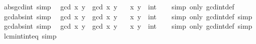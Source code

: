 \begin{isabellebody}
\ abs{\isacharunderscore}{\kern0pt}gcd{\isacharunderscore}{\kern0pt}int\ {\isacharbrackleft}{\kern0pt}simp{\isacharbrackright}{\kern0pt}{\isacharcolon}{\kern0pt}\isanewline
\ \ {\isachardoublequoteopen}{\isasymbar}gcd\ x\ y{\isasymbar}\ {\isacharequal}{\kern0pt}\ gcd\ x\ y{\isachardoublequoteclose}\isanewline
\ \ \ x\ y\ {\isacharcolon}{\kern0pt}{\isacharcolon}{\kern0pt}\ int\isanewline
%
\isadelimproof
\ \ %
\endisadelimproof
%
\isatagproof
{}\isamarkupfalse%
\ {\isacharparenleft}{\kern0pt}simp\ only{\isacharcolon}{\kern0pt}\ gcd{\isacharunderscore}{\kern0pt}int{\isacharunderscore}{\kern0pt}def{\isacharparenright}{\kern0pt}%
\endisatagproof
{\isafoldproof}%
%
\isadelimproof
\isanewline
%
\endisadelimproof
\isanewline
{}\isamarkupfalse%
\ gcd{\isacharunderscore}{\kern0pt}abs{}{\isacharunderscore}{\kern0pt}int\ {\isacharbrackleft}{\kern0pt}simp{\isacharbrackright}{\kern0pt}{\isacharcolon}{\kern0pt}\isanewline
\ \ {\isachardoublequoteopen}gcd\ {\isasymbar}x{\isasymbar}\ y\ {\isacharequal}{\kern0pt}\ gcd\ x\ y{\isachardoublequoteclose}\isanewline
\ \ \ x\ y\ {\isacharcolon}{\kern0pt}{\isacharcolon}{\kern0pt}\ int\isanewline
%
\isadelimproof
\ \ %
\endisadelimproof
%
\isatagproof
{}\isamarkupfalse%
\ {\isacharparenleft}{\kern0pt}simp\ only{\isacharcolon}{\kern0pt}\ gcd{\isacharunderscore}{\kern0pt}int{\isacharunderscore}{\kern0pt}def{\isacharparenright}{\kern0pt}\ simp%
\endisatagproof
{\isafoldproof}%
%
\isadelimproof
\isanewline
%
\endisadelimproof
\isanewline
{}\isamarkupfalse%
\ gcd{\isacharunderscore}{\kern0pt}abs{}{\isacharunderscore}{\kern0pt}int\ {\isacharbrackleft}{\kern0pt}simp{\isacharbrackright}{\kern0pt}{\isacharcolon}{\kern0pt}\isanewline
\ \ {\isachardoublequoteopen}gcd\ x\ {\isasymbar}y{\isasymbar}\ {\isacharequal}{\kern0pt}\ gcd\ x\ y{\isachardoublequoteclose}\isanewline
\ \ \ x\ y\ {\isacharcolon}{\kern0pt}{\isacharcolon}{\kern0pt}\ int\isanewline
%
\isadelimproof
\ \ %
\endisadelimproof
%
\isatagproof
{}\isamarkupfalse%
\ {\isacharparenleft}{\kern0pt}simp\ only{\isacharcolon}{\kern0pt}\ gcd{\isacharunderscore}{\kern0pt}int{\isacharunderscore}{\kern0pt}def{\isacharparenright}{\kern0pt}\ simp%
\endisatagproof
{\isafoldproof}%
%
\isadelimproof
\isanewline
%
\endisadelimproof
\isanewline
{}\isamarkupfalse%
\ lcm{\isacharunderscore}{\kern0pt}int{\isacharunderscore}{\kern0pt}int{\isacharunderscore}{\kern0pt}eq\ {\isacharbrackleft}{\kern0pt}simp{\isacharbrackright}{\kern0pt}{\isacharcolon}{\kern0pt}\isanewline

\end{isabellebody}
